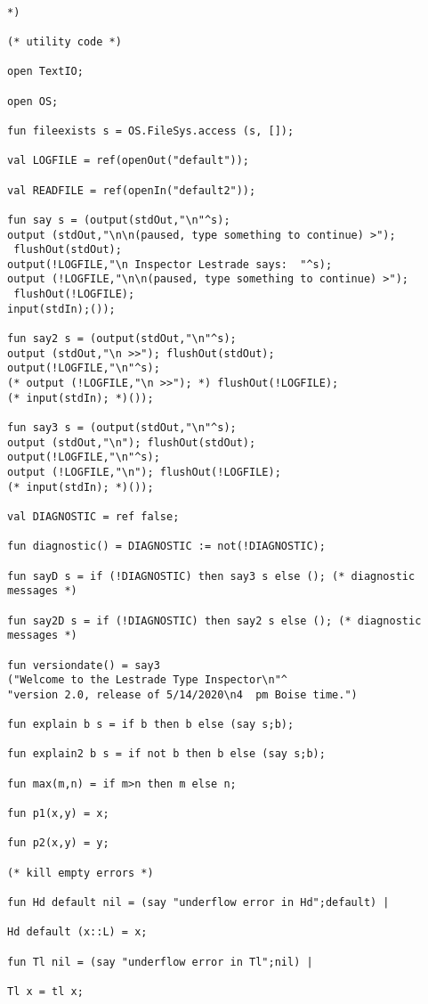 \documentclass[12pt]{article}
\begin{document}
\begin{verbatim}

*)

(* utility code *)

open TextIO;

open OS;

fun fileexists s = OS.FileSys.access (s, []);

val LOGFILE = ref(openOut("default"));

val READFILE = ref(openIn("default2"));

fun say s = (output(stdOut,"\n"^s);
output (stdOut,"\n\n(paused, type something to continue) >");
 flushOut(stdOut);
output(!LOGFILE,"\n Inspector Lestrade says:  "^s);
output (!LOGFILE,"\n\n(paused, type something to continue) >");
 flushOut(!LOGFILE);
input(stdIn);());

fun say2 s = (output(stdOut,"\n"^s);
output (stdOut,"\n >>"); flushOut(stdOut);
output(!LOGFILE,"\n"^s);
(* output (!LOGFILE,"\n >>"); *) flushOut(!LOGFILE);
(* input(stdIn); *)());

fun say3 s = (output(stdOut,"\n"^s);
output (stdOut,"\n"); flushOut(stdOut);
output(!LOGFILE,"\n"^s);
output (!LOGFILE,"\n"); flushOut(!LOGFILE);
(* input(stdIn); *)());

val DIAGNOSTIC = ref false;

fun diagnostic() = DIAGNOSTIC := not(!DIAGNOSTIC);

fun sayD s = if (!DIAGNOSTIC) then say3 s else (); (* diagnostic messages *)

fun say2D s = if (!DIAGNOSTIC) then say2 s else (); (* diagnostic messages *)

fun versiondate() = say3
("Welcome to the Lestrade Type Inspector\n"^
"version 2.0, release of 5/14/2020\n4  pm Boise time.")

fun explain b s = if b then b else (say s;b);

fun explain2 b s = if not b then b else (say s;b);

fun max(m,n) = if m>n then m else n;

fun p1(x,y) = x;

fun p2(x,y) = y;

(* kill empty errors *)

fun Hd default nil = (say "underflow error in Hd";default) |

Hd default (x::L) = x;

fun Tl nil = (say "underflow error in Tl";nil) |

Tl x = tl x;




\end{verbatim}
\end{document}
